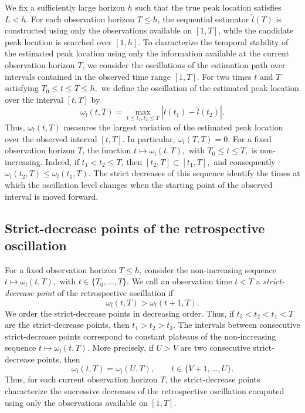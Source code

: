 \documentclass[12pt,a4paper]{article}
\begin{document}
We fix a sufficiently large horizon \(h\) such that the true peak location satisfies
\(L<h\). For each observation horizon \(T\leq h\), the sequential estimator \(\hat{l}(T)\) is constructed using only the observations available on \([1,T]\), while the candidate peak location is searched over \([1,h]\).
To characterize the temporal stability of the estimated peak location using only the information available at the current observation horizon \(T\), we consider the oscillations of the estimation path over intervals contained in the observed time range \([1,T]\). For two times \(t\) and \(T\) satisfying
\(
T_0\leq t\leq T\leq h,
\)
we define the oscillation of the estimated peak location over the interval \([t,T]\) by
\begin{equation}
	\omega_l(t,T)
	=
	\max_{t\leq t_1,t_2\leq T}
	\left|
	\hat{l}(t_1)-\hat{l}(t_2)
	\right|.
	\label{eq:local_oscillation}
\end{equation}
Thus, \(\omega_l(t,T)\) measures the largest variation of the estimated peak location over the observed interval \([t,T]\). In particular,
\(
\omega_l(T,T)=0.
\)
For a fixed observation horizon \(T\), the function
$t\longmapsto\omega_l(t,T),$
with
$T_0\leq t\leq T,$
is non-increasing. Indeed, if \(t_1<t_2\leq T\), then
\(
[t_2,T]\subset[t_1,T],
\)
and consequently
\(
\omega_l(t_2,T)\leq\omega_l(t_1,T).
\)
The strict decreases of this sequence identify the times at which the oscillation level changes when the starting point of the observed interval is moved forward.

\subsection{Strict-decrease points of the retrospective oscillation}
\label{subsec:strict-decrease-points}

For a fixed observation horizon \(T\leq h\), consider the non-increasing sequence
$t\longmapsto\omega_l(t,T),$
with 
$t\in\{T_0,\ldots,T\}.$
We call an observation time \(t<T\) a \emph{strict-decrease point} of the retrospective oscillation if
\[
\omega_l(t,T)>\omega_l(t+1,T).
\]
We order the strict-decrease points in decreasing order. Thus, if
\(
t_3<t_2<t_1<T
\)
are the strict-decrease points, then
\(
t_1>t_2>t_3.
\)
The intervals between consecutive strict-decrease points correspond to constant plateaus of the non-increasing sequence \(t\mapsto\omega_l(t,T)\). More precisely, if \(U>V\) are two consecutive strict-decrease points, then
\[
\omega_l(t,T)=\omega_l(U,T),
\qquad
t\in\{V+1,\ldots,U\}.
\]
Thus, for each current observation horizon \(T\), the strict-decrease points characterize the successive decreases of the retrospective oscillation computed using only the observations available on \([1,T]\).
\end{document}
